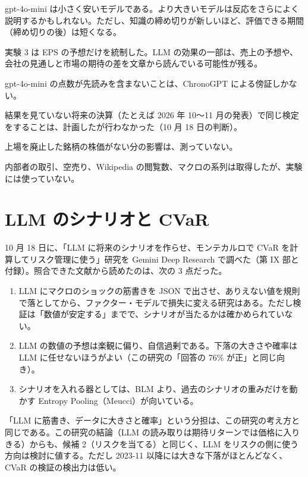 \begin{description}[leftmargin=1.5em,style=nextline,itemsep=0.4em]
\item[gpt-4o-mini より強い LLM] gpt-4o-mini は小さく安いモデルである。より大きいモデルは反応をさらによく説明するかもしれない。ただし、知識の締め切りが新しいほど、評価できる期間（締め切りの後）は短くなる。
\item[アナリスト予想の売上とガイダンス] 実験 3 は EPS の予想だけを統制した。LLM の効果の一部は、売上の予想や、会社の見通しと市場の期待の差を文章から読んでいる可能性が残る。
\item[記憶の完全な排除] gpt-4o-mini の点数が先読みを含まないことは、ChronoGPT による傍証しかない。
\item[前向きの再現] 結果を見ていない将来の決算（たとえば 2026 年 10〜11 月の発表）で同じ検定をすることは、計画したが行わなかった（10 月 18 日の判断）。
\item[生存者バイアスの大きさ] 上場を廃止した銘柄の株価がない分の影響は、測っていない。
\item[追加のデータ] 内部者の取引、空売り、Wikipedia の閲覧数、マクロの系列は取得したが、実験には使っていない。
\end{description}

\section{LLM のシナリオと CVaR}

10 月 18 日に、「LLM に将来のシナリオを作らせ、モンテカルロで CVaR を計算してリスク管理に使う」研究を Gemini Deep Research で調べた（第 IX 部と付録）。照合できた文献から読めたのは、次の 3 点だった。
\begin{enumerate}
\item LLM にマクロのショックの筋書きを JSON で出させ、ありえない値を規則で落としてから、ファクター・モデルで損失に変える研究はある。ただし検証は「数値が安定する」までで、シナリオが当たるかは確かめられていない。
\item LLM の数値の予想は楽観に偏り、自信過剰である。下落の大きさや確率は LLM に任せないほうがよい（この研究の「回答の 76\% が正」と同じ向き）。
\item シナリオを入れる器としては、BLM より、過去のシナリオの重みだけを動かす Entropy Pooling（Meucci）が向いている。
\end{enumerate}
「LLM に筋書き、データに大きさと確率」という分担は、この研究の考え方と同じである。この研究の結論（LLM の読み取りは期待リターンでは価格に入りきる）からも、候補 2（リスクを当てる）と同じく、LLM をリスクの側に使う方向は検討に値する。ただし 2023-11 以降には大きな下落がほとんどなく、CVaR の検証の検出力は低い。
